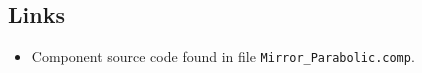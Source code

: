 \subsection*{Links}
\begin{itemize}
  \item Component source code found in file \texttt{Mirror\_Parabolic.comp}.
\end{itemize}
